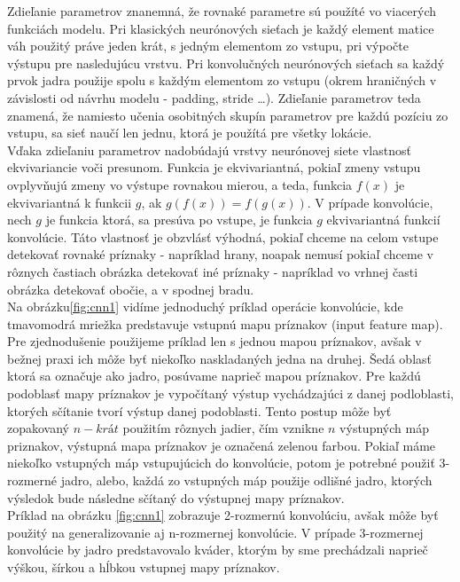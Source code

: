 \indent Zdieľanie parametrov znanemná, že rovnaké parametre sú použíté vo viacerých funkciách modelu.
Pri klasických neurónových sieťach je každý element matice váh použitý práve jeden krát, s jedným  elementom zo vstupu, pri výpočte výstupu pre nasledujúcu vrstvu.
Pri konvolučných neurónových sieťach sa každý prvok jadra použije spolu s každým elementom zo vstupu (okrem hraničných v závislosti od návrhu modelu - padding, stride \dots). Zdieľanie parametrov teda znamená, že namiesto učenia osobitných skupín parametrov pre každú pozíciu zo vstupu, sa sieť naučí len jednu, ktorá je použítá pre všetky lokácie.\cite{goodfellow2016deep} \\

\indent Vďaka zdieľaniu parametrov nadobúdajú vrstvy neurónovej siete vlastnosť ekvivariancie voči presunom.
Funkcia je ekvivariantná, pokiaľ zmeny vstupu ovplyvňujú zmeny vo výstupe rovnakou mierou, a teda, 
funkcia $f(x)$ je ekvivariantná k funkcii $g$, ak $g(f(x)) = f(g(x))$.
V prípade konvolúcie, nech $g$ je funkcia ktorá, sa presúva po vstupe, je funkcia $g$ ekvivariantná funkcií konvolúcie.
Táto vlastnosť je obzvlásť výhodná, pokiaľ chceme na celom vstupe detekovať rovnaké príznaky - napríklad hrany, noapak nemusí pokiaľ chceme v rôznych častiach obrázka detekovať iné príznaky - napríklad vo vrhnej časti obrázka detekovať obočie, a v spodnej bradu. \cite{goodfellow2016deep} \\

\indent Na obrázku\ref{fig:cnn1} vidíme jednoduchý príklad operácie konvolúcie, kde tmavomodrá mriežka  predstavuje vstupnú mapu príznakov (input feature map).
Pre zjednodušenie použijeme príklad len s jednou mapou príznakov, avšak v bežnej praxi ich môže byť niekoľko naskladaných jedna na druhej.
Šedá oblasť ktorá sa označuje ako jadro, posúvame naprieč mapou príznakov.
Pre každú podoblasť mapy príznakov je vypočítaný výstup vychádzajúci z danej podloblasti, ktorých sčítanie tvorí výstup danej podoblasti.\cite{dumoulin2016guide}
Tento postup môže byť zopakovaný $n-krát$ použitím rôznych jadier, čím vznikne $n$ výstupných máp priznakov, výstupná mapa príznakov je označená zelenou farbou.
Pokiaľ máme niekoľko vstupných máp vstupujúcich do konvolúcie, potom je potrebné použiť 3-rozmerné jadro, alebo, každá zo vstupných máp použije odlišné jadro, ktorých výsledok bude následne sčítaný do výstupnej mapy príznakov.\\
\indent Príklad na obrázku \ref{fig:cnn1} zobrazuje 2-rozmernú konvolúciu, avšak môže byť  použitý na generalizovanie aj n-rozmernej konvolúcie.
V prípade 3-rozmernej konvolúcie by jadro predstavovalo kváder, ktorým by sme prechádzali naprieč výškou, šírkou a hĺbkou vstupnej mapy príznakov.\cite{dumoulin2016guide} \\

